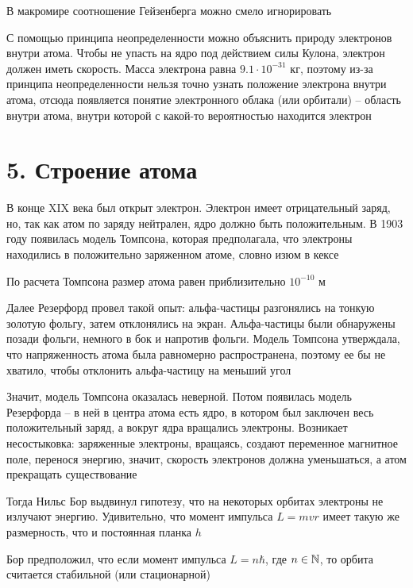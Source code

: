 \documentclass[12pt]{article}
\begin{document}
В макромире соотношение Гейзенберга можно смело игнорировать

С помощью принципа неопределенности можно объяснить природу электронов внутри атома. Чтобы не упасть на ядро под действием силы Кулона, электрон должен иметь скорость. Масса электрона равна $9.1 \cdot 10^{-31}$ кг, поэтому из-за принципа неопределенности нельзя точно узнать положение электрона внутри атома, отсюда появляется понятие электронного облака (или орбитали) -- область внутри атома, внутри которой с какой-то вероятностью находится электрон

\section{5. Строение атома}

В конце XIX века был открыт электрон. Электрон имеет отрицательный заряд, но, так как атом по заряду нейтрален, ядро должно быть положительным. В 1903 году появилась модель Томпсона, которая предполагала, что электроны находились в положительно заряженном атоме, словно изюм в кексе 

По расчета Томпсона размер атома равен приблизительно $10^{-10}$ м

Далее Резерфорд провел такой опыт: альфа-частицы разгонялись на тонкую золотую фольгу, затем отклонялись на экран. Альфа-частицы были обнаружены позади фольги, немного в бок и напротив фольги. Модель Томпсона утверждала, что напряженность атома была равномерно распространена, поэтому ее бы не хватило, чтобы отклонить альфа-частицу на меньший угол

Значит, модель Томпсона оказалась неверной. Потом появилась модель Резерфорда -- в ней в центра атома есть ядро, в котором был заключен весь положительный заряд, а вокруг ядра вращались электроны. Возникает несостыковка: заряженные электроны, вращаясь, создают переменное магнитное поле, перенося энергию, значит, скорость электронов должна уменьшаться, а атом прекращать существование

Тогда Нильс Бор выдвинул гипотезу, что на некоторых орбитах электроны не излучают энергию. Удивительно, что момент импульса $L = m v r$ имеет такую же размерность, что и постоянная планка $h$

Бор предположил, что если момент импульса $L = n \hbar$, где $n \in \mathbb{N}$, то орбита считается стабильной (или стационарной)



\end{document}

